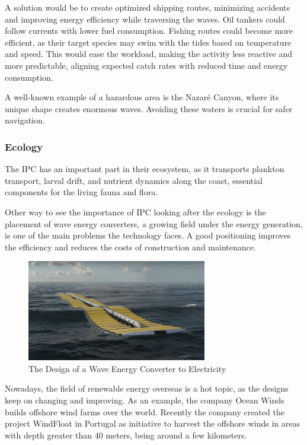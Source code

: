 A solution would be to create optimized shipping routes, minimizing accidents and improving energy efficiency while 
traversing the waves. Oil tankers could follow currents with lower fuel consumption. Fishing routes could become more
efficient, as their target species may swim with the tides based on temperature and speed. This would ease the workload,
making the activity less reactive and more predictable, aligning expected catch rates with reduced time and energy 
consumption.

A well-known example of a hazardous area is the Nazaré Canyon, where its unique shape creates enormous waves. 
Avoiding these waters is crucial for safer navigation.

\subsubsection{Ecology}

The IPC has an important part in their ecosystem, as it transports plankton transport, larval drift, and 
nutrient dynamics along the coast, essential components for the living fauna and flora.


Other way to see the importance of IPC looking after the ecology is the placement of wave energy converters, a 
growing field under the energy generation, is one of the main problems the technology faces. 
A good positioning improves the efficiency and reduces the costs of construction and maintenance.
\begin{figure}[H]
    \centering
    \includegraphics[width=0.7\textwidth]{images/chapter/introduction/renewable_energy.png}  %
    \caption{The Design of a Wave Energy Converter to Electricity}
    \label{fig:The Design of a Wave Energy Converter to Electricity}        
\end{figure}

Nowadays, the field of renewable energy overseas is a hot topic, as the designs keep on changing and improving. As an example, the company
Ocean Winds builds offshore wind farms over the world. Recently the company created the project WindFloat in Portugal as initiative
to harvest the offshore winds in areas with depth greater than 40 meters, being around a few kilometers.

